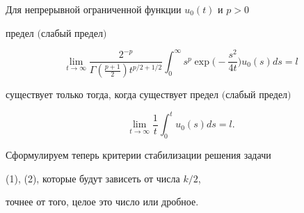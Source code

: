 \begin{thm}


Для непрерывной ограниченной функции $u_0(t)$ и $p>0$


предел $($слабый предел$)$


$$


\lim_{t\to\infty}


\frac{2^{-p}}{\Gamma \left(\frac{p+1}{2}\right)


t^{p/2+1/2}} \int_0^\infty


s^p \exp\bigg (-\frac{s^2}{4t}\bigg) u_0(s) ds=l


$$


существует только тогда, когда существует предел $($слабый предел$)$


$$


\lim_{t\to\infty} \frac{1}{t}


\int_0^t u_0(s) ds=l.


$$


\end{thm}





Сформулируем теперь критерии стабилизации решения задачи


(1), (2), которые будут зависеть от числа $k/2$,


точнее от того, целое это число или дробное.





